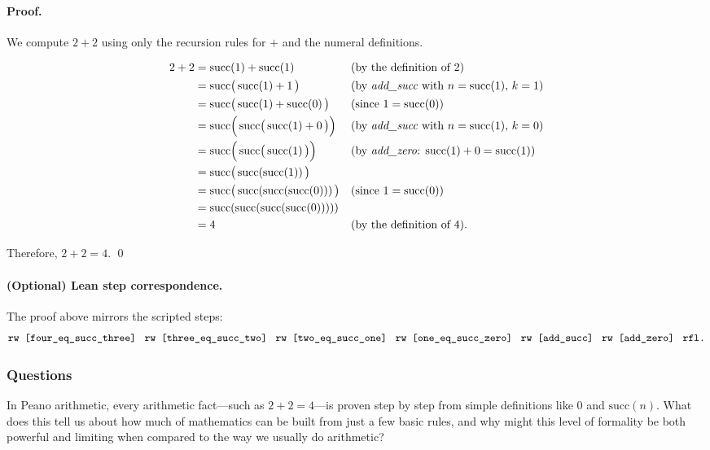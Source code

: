 \documentclass{article}
\theoremstyle{theorem}
\theoremstyle{definition}
\theoremstyle{remark}
\begin{document}
\paragraph{Proof.}
We compute $2+2$ using only the recursion rules for $+$ and the numeral definitions.

\begin{align*}
2+2
&= \mathrm{succ}(1) + \mathrm{succ}(1) && \text{(by the definition of $2$)}\\
&= \mathrm{succ}\big(\,\mathrm{succ}(1) + 1\,\big) && \text{(by \textit{add\_succ} with $n=\mathrm{succ}(1),\,k=1$)}\\
&= \mathrm{succ}\big(\,\mathrm{succ}(1) + \mathrm{succ}(0)\,\big) && \text{(since $1=\mathrm{succ}(0)$)}\\
&= \mathrm{succ}\Big(\,\mathrm{succ}\big(\,\mathrm{succ}(1) + 0\,\big)\Big) && \text{(by \textit{add\_succ} with $n=\mathrm{succ}(1),\,k=0$)}\\
&= \mathrm{succ}\Big(\,\mathrm{succ}\big(\,\mathrm{succ}(1)\,\big)\Big) && \text{(by \textit{add\_zero}: $\mathrm{succ}(1)+0=\mathrm{succ}(1)$)}\\
&= \mathrm{succ}\big(\,\mathrm{succ}(\mathrm{succ}(1))\,\big)\\
&= \mathrm{succ}\big(\,\mathrm{succ}(\mathrm{succ}(\mathrm{succ}(0)))\,\big) && \text{(since $1=\mathrm{succ}(0)$)}\\
&= \mathrm{succ}(\mathrm{succ}(\mathrm{succ}(\mathrm{succ}(0)))))\\
&= 4 && \text{(by the definition of $4$).}
\end{align*}

Therefore, $2+2=4$.
\qed

\paragraph{(Optional) Lean step correspondence.}
The proof above mirrors the scripted steps:
\[
\texttt{rw [four\_eq\_succ\_three]\; rw [three\_eq\_succ\_two]\; rw [two\_eq\_succ\_one]\; rw [one\_eq\_succ\_zero]\; rw [add\_succ]\; rw [add\_zero]\; rfl.}
\]

\subsubsection{Questions}
In Peano arithmetic, every arithmetic fact—such as $2+2=4$—is proven step by step from simple definitions like $0$ and $\mathrm{succ}(n)$. 
What does this tell us about how much of mathematics can be built from just a few basic rules, and why might this level of formality be both powerful and limiting when compared to the way we usually do arithmetic?
\end{document}
